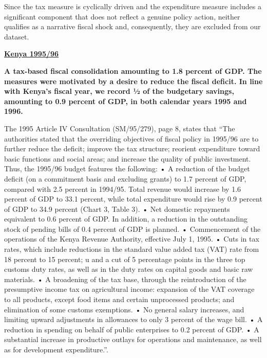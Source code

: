 Since the tax measure is cyclically driven and the expenditure measure includes a significant component that does not reflect a genuine policy action, neither qualifies as a narrative fiscal shock and, consequently, they are excluded from our dataset.

\textbf{\underline{Kenya 1995/96}}

\textbf{A tax-based fiscal consolidation amounting to 1.8 percent of GDP. The measures were motivated by a desire to reduce the fiscal deficit. In line with Kenya’s fiscal year, we record ½ of the budgetary savings, amounting to 0.9 percent of GDP, in both calendar years 1995 and 1996.}

The 1995 Article IV Consultation (SM/95/279), page 8, states that “The authorities stated that the overriding objectives of fiscal policy in 1995/96 are to further reduce the deficit; improve the tax structure; reorient expenditure toward basic functions and social areas; and increase the quality of public investment. Thus, the 1995/96 budget features the following: 
•	A reduction of the budget deficit (on a commitment basis and excluding grants) to 1.7 percent of GDP, compared with 2.5 percent in 1994/95. Total revenue would increase by 1.6 percent of GDP to 33.1 percent, while total expenditure would rise by 0.9 percent of GDP to 34.9 percent (Chart 3, Table 3).
•	Net domestic repayments equivalent to 0.6 percent of GDP. In addition, a reduction in the outstanding stock of pending bills of 0.4 percent of GDP is planned. 
•	Commencement of the operations of the Kenya Revenue Authority, effective July 1, 1995.
•	Cuts in tax rates, which include reductions in the standard value added tax (VAT) rate from 18 percent to 15 percent; u and a cut of 5 percentage points in the three top customs duty rates, as well as in the duty rates on capital goods and basic raw materials.
•	A broadening of the tax base, through the reintroduction of the presumptive income tax on agricultural income: expansion of the VAT coverage to all products, except food items and certain unprocessed products; and elimination of some customs exemptions.
•	No general salary increases, and limiting upward adjustments in allowances to only 3 percent of the wage bill. 
•	A reduction in spending on behalf of public enterprises to 0.2 percent of GDP.
•	A substantial increase in productive outlays for operations and maintenance, as well as for development expenditure.”. 

